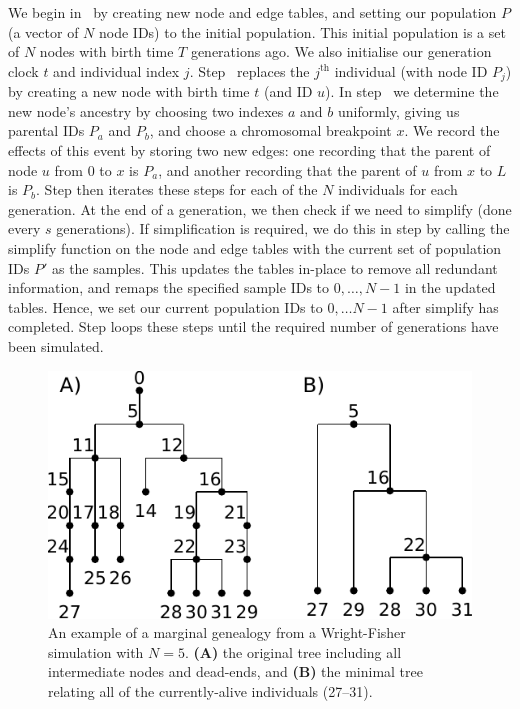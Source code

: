 \documentclass{article}
\begin{document}
We begin in~ by creating new node and edge tables, and setting
our population $P$ (a vector of $N$ node IDs) to the initial population.
This initial population is a set of $N$ nodes with birth time $T$ generations
ago. We also initialise our generation clock $t$ and individual index $j$.
Step~ replaces the $j^\text{th}$ individual (with node ID $P_j$)
by creating a new node with birth time $t$ (and ID $u$).
In step~ we determine the new node's ancestry
by choosing two indexes $a$ and $b$ uniformly,
giving us parental IDs $P_a$ and $P_b$,
and choose a chromosomal breakpoint $x$.
We record the effects of this event by storing two new edges: one recording that the parent of node $u$
from $0$ to $x$ is $P_a$, and another recording that the parent of $u$
from $x$ to $L$ is $P_b$. Step  then iterates these steps
for each of the $N$ individuals for each generation.
At the end of a generation, we then check
if we need to simplify (done every $s$ generations).
If simplification is required, we do this in step  by calling the simplify function
on the node and edge tables with the current set of population IDs $P'$ as the samples.
This updates the tables in-place to remove all redundant
information, and remaps the specified sample IDs to $0, \dots, N - 1$ in the updated tables.
Hence, we set our current population IDs to
$0, \dots N - 1$ after simplify has completed.
Step  loops these steps until the required number of generations have been simulated.


\begin{figure}
    \begin{center}
        \includegraphics{wf-before-after}
    \end{center}
    \caption{An example of a marginal genealogy from a Wright-Fisher simulation
    with $N=5$. \textbf{(A)} the original tree including all
    intermediate nodes and dead-ends, and \textbf{(B)} the minimal tree
    relating all of the currently-alive individuals (27--31).
    \label{fig:wf-trees}
    }
\end{figure}
\end{document}
